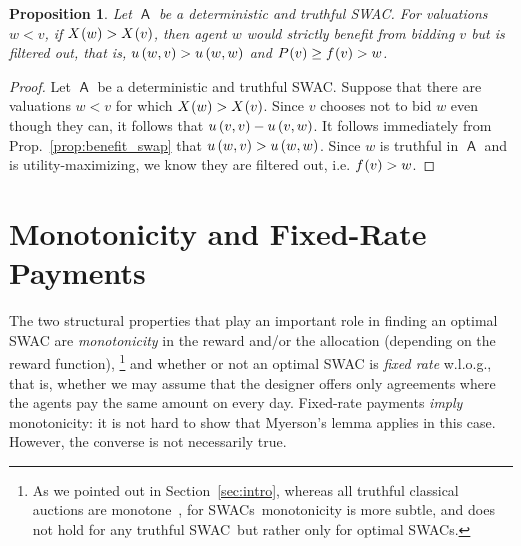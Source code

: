 \documentclass[11pt,letterpaper]{article}
\newcommand{\swac}{SWAC\xspace}
\newcommand{\swacs}{SWACs\xspace}
\DeclareMathOperator{\A}{\auc{A}}
\theoremstyle{plain}
\newtheorem{proposition}[theorem]{Proposition}
\newcommand{\auc}[1]{\mathsf{#1}}
\begin{document}
\begin{proposition}
\label{prop:un_monotonicity_means_filter}
    Let $\A$ be a deterministic and truthful \swac. For valuations $w<v$, if $\x{w}>\x{v}$, then agent $w$ would strictly benefit from bidding $v$ but is filtered out, that is, $\util{w}{v}>\util{w}{w}$ and $\p{v}\geq\f{v}>w$.
\end{proposition}
\begin{proof}
Let $\A$ be a deterministic and truthful \swac. Suppose that there are valuations $w<v$ for which $\x{w}>\x{v}$. Since $v$ chooses not to bid $w$ even though they can, it follows that $\util{v}{v}-\util{v}{w}$. It follows immediately from Prop.~\ref{prop:benefit_swap} that $\util{w}{v}>\util{w}{w}$. Since $w$ is truthful in $\A$ and is utility-maximizing, we know they are filtered out, i.e. $\f{v}>w$.
\end{proof}





\section{Monotonicity and Fixed-Rate Payments}
\label{sec:tech-overview-mono}

The two structural properties that play an important role in finding an optimal \swac
are \emph{monotonicity} in the reward and/or the allocation (depending on the reward function),%
\footnote{
As we pointed out in Section~\ref{sec:intro},
whereas all truthful classical auctions are monotone~\cite{myerson1981optimal}, for \swacs\ monotonicity is more subtle, and does not hold for any truthful \swac\ but rather only for optimal \swacs.}
and whether or not an optimal \swac 
is \emph{fixed rate} w.l.o.g.,
that is,
whether
we may assume that
the designer
offers only agreements where the agents pay the same amount on every day.
Fixed-rate payments \emph{imply} monotonicity:
it is not hard to show that Myerson's lemma applies in this case.
However, the converse is not necessarily true.

\end{document}
